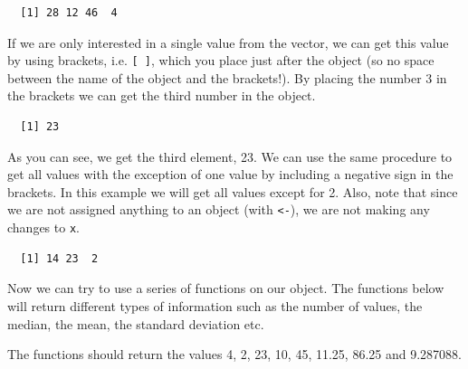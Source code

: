 \documentclass[12pt,oneside]{reedthesis}
\theoremstyle{definition}
\theoremstyle{definition}
\theoremstyle{definition}
\theoremstyle{remark}
\begin{document}
  \begin{verbatim}
  [1] 28 12 46  4
  \end{verbatim}
  If we are only interested in a single value from the vector, we can get
  this value by using brackets, i.e. \texttt{{[}\ {]}}, which you place
  just after the object (so no space between the name of the object and
  the brackets!). By placing the number 3 in the brackets we can get the
  third number in the object.
  \begin{Shaded}
  \begin{Highlighting}[]
  \NormalTok{x[}\NormalTok{]}
  \end{Highlighting}
  \end{Shaded}
  \begin{verbatim}
  [1] 23
  \end{verbatim}
  As you can see, we get the third element, 23. We can use the same
  procedure to get all values with the exception of one value by including
  a negative sign in the brackets. In this example we will get all values
  except for 2. Also, note that since we are not assigned anything to an
  object (with \texttt{\textless{}-}), we are not making any changes to
  \texttt{x}.
  \begin{Shaded}
  \begin{Highlighting}[]
  \NormalTok{x[}\OperatorTok{-}\NormalTok{]}
  \end{Highlighting}
  \end{Shaded}
  \begin{verbatim}
  [1] 14 23  2
  \end{verbatim}
  Now we can try to use a series of functions on our object. The functions
  below will return different types of information such as the number of
  values, the median, the mean, the standard deviation etc.
  \begin{Shaded}
  \begin{Highlighting}[]
  \end{Highlighting}
  \end{Shaded}
  The functions should return the values 4, 2, 23, 10, 45, 11.25, 86.25
  and 9.287088.
  
\end{document}
